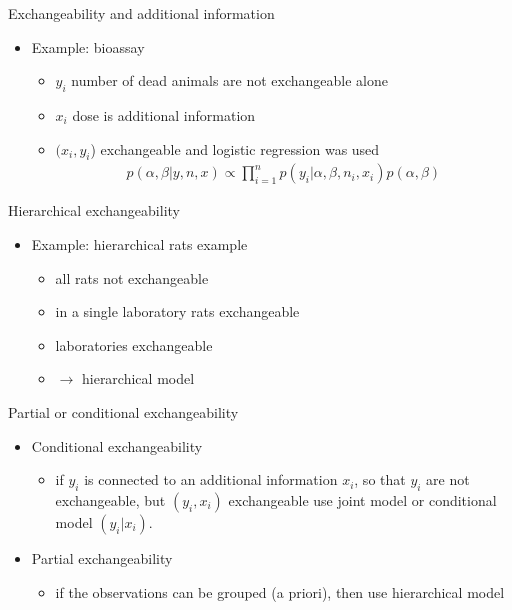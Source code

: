 \documentclass[finnish,english,t]{beamer}
\begin{document}
\begin{frame}{Exchangeability and additional information}

  \begin{itemize}
  \item Example: bioassay
    \begin{itemize}
      \item<+-> $y_i$ number of dead animals are not exchangeable alone
      \item<+-> $x_i$ dose is additional information
      \item<+-> $(x_i,y_i$) exchangeable and logistic regression was used
    \begin{align*}
      p(\alpha,\beta|y,n,x)\propto \prod_{i=1}^n p(y_i|\alpha,\beta,n_i,x_i)p(\alpha,\beta)
    \end{align*}
    \end{itemize}
  \end{itemize}
\end{frame}

\begin{frame}{Hierarchical exchangeability}

  \begin{itemize}
  \item Example: hierarchical rats example
    \begin{itemize}
    \item<+-> all rats not exchangeable
    \item<+-> in a single laboratory rats exchangeable
    \item<+-> laboratories exchangeable
    \item<+-> $\rightarrow$ hierarchical model
    \end{itemize}
  \end{itemize}
\end{frame}

\begin{frame}
  
  {\Large\color{navyblue} Partial or conditional exchangeability}

\begin{itemize}
  \item Conditional exchangeability
    \begin{itemize}
    \item if $y_i$ is connected to an additional information $x_i$, so
      that $y_i$ are not exchangeable, but $(y_i,x_i)$ exchangeable
      use joint model or conditional model $(y_i|x_i)$.
    \end{itemize}
  \item<2-> Partial exchangeability
    \begin{itemize}
    \item if the observations can be grouped (a priori), then use
      hierarchical model
    \end{itemize}
\end{itemize}
\end{frame}
\end{document}
